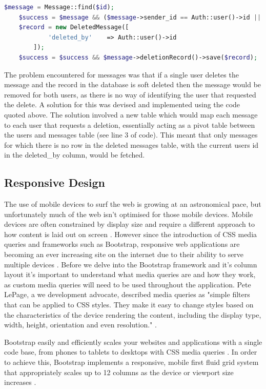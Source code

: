 \begin{lstlisting}[language=php]
	$message = Message::find($id);
	$success = $message && ($message->sender_id == Auth::user()->id || $message->recipient_id == Auth::user()->id);
	$record = new DeletedMessage([
			'deleted_by'    => Auth::user()->id
        ]);
	$success = $success && $message->deletionRecord()->save($record);
\end{lstlisting}

The problem encountered for messages was that if a single user deletes the message and the record in the database is soft deleted then the message would be removed for both users, as there is no way of identifying the user that requested the delete. A solution for this was devised and implemented using the code quoted above. The solution involved a new table which would map each message to each user that requests a deletion, essentially acting as a pivot table between the users and messages table (see line 3 of code). This meant that only messages for which there is no row in the deleted messages table, with the current users id in the deleted\_by column, would be fetched.

\subsection{Responsive Design}
The use of mobile devices to surf the web is growing at an astronomical pace, but unfortunately much of the web isn't optimised for those mobile devices. Mobile devices are often constrained by display size and require a different approach to how content is laid out on screen \cite{GoogleDev:Responsiveness}. However since the introduction of CSS media queries and frameworks such as Bootstrap, responsive web applications are becoming an ever increasing site on the internet due to their ability to serve multiple devices \cite{Bootstrap:Home}. Before we delve into the Bootstrap framework and it's column layout it's important to understand what media queries are and how they work, as custom media queries will need to be used throughout the application. Pete LePage, a we development advocate, described media queries as "simple filters that can be applied to CSS styles. They make it easy to change styles based on the characteristics of the device rendering the content, including the display type, width, height, orientation and even resolution." \cite{GoogleDev:Responsiveness}.

Bootstrap easily and efficiently scales your websites and applications with a single code base, from phones to tablets to desktops with CSS media queries \cite{Bootstrap:Home}. In order to achieve this, Bootstrap implements a responsive, mobile first fluid grid system that appropriately scales up to 12 columns as the device or viewport size increases \cite{Bootstrap:Grid}.

